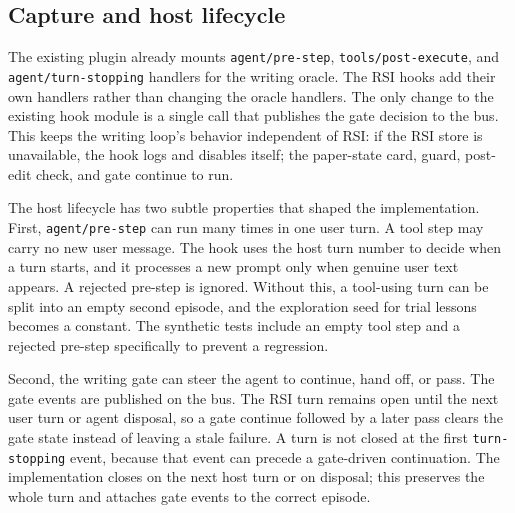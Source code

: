 \subsection{Capture and host lifecycle}
\label{sec:host-lifecycle}
The existing plugin already mounts \texttt{agent/\allowbreak pre-step}, \texttt{tools/\allowbreak post-execute}, and \texttt{agent/\allowbreak turn-stopping} handlers for the writing oracle. The RSI hooks add their own handlers rather than changing the oracle handlers. The only change to the existing hook module is a single call that publishes the gate decision to the bus. This keeps the writing loop's behavior independent of RSI: if the RSI store is unavailable, the hook logs and disables itself; the paper-state card, guard, post-edit check, and gate continue to run.

The host lifecycle has two subtle properties that shaped the implementation. First, \texttt{agent/\allowbreak pre-step} can run many times in one user turn. A tool step may carry no new user message. The hook uses the host turn number to decide when a turn starts, and it processes a new prompt only when genuine user text appears. A rejected pre-step is ignored. Without this, a tool-using turn can be split into an empty second episode, and the exploration seed for trial lessons becomes a constant. The synthetic tests include an empty tool step and a rejected pre-step specifically to prevent a regression.

Second, the writing gate can steer the agent to continue, hand off, or pass. The gate events are published on the bus. The RSI turn remains open until the next user turn or agent disposal, so a gate continue followed by a later pass clears the gate state instead of leaving a stale failure. A turn is not closed at the first \texttt{turn-stopping} event, because that event can precede a gate-driven continuation. The implementation closes on the next host turn or on disposal; this preserves the whole turn and attaches gate events to the correct episode.

